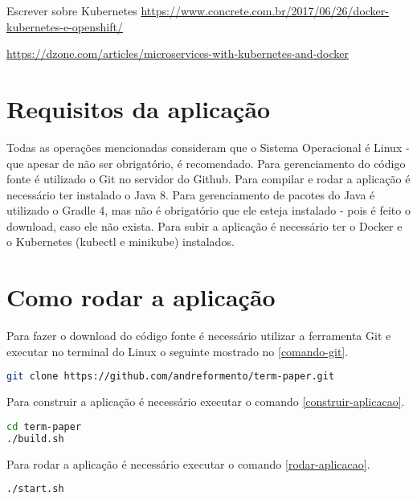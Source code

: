 Escrever sobre Kubernetes
\url{https://www.concrete.com.br/2017/06/26/docker-kubernetes-e-openshift/}

\url{https://dzone.com/articles/microservices-with-kubernetes-and-docker}



\section{Requisitos da aplicação}\label{requisitos-da-aplicacao}

Todas as operações mencionadas consideram que o Sistema Operacional é Linux
- que apesar de não ser obrigatório, é recomendado.
Para gerenciamento do código fonte é utilizado o Git no servidor do Github.
Para compilar e rodar a aplicação é necessário ter instalado o Java 8.
Para gerenciamento de pacotes do Java é utilizado o Gradle 4, mas não
é obrigatório que ele esteja instalado - pois é feito o download, caso
ele não exista. Para subir a aplicação é necessário ter o Docker e o
Kubernetes (kubectl e minikube) instalados.


\section{Como rodar a aplicação}\label{como-rodar-a-aplicacao}

Para fazer o download do código fonte é necessário utilizar a ferramenta Git
e executar no terminal do Linux o seguinte mostrado no \autoref{comando-git}.


\begin{lstlisting}[language=bash,label=comando-git,caption=Como fazer o download do código fonte com o Git]
git clone https://github.com/andreformento/term-paper.git
\end{lstlisting}

Para construir a aplicação é necessário executar o comando
\autoref{construir-aplicacao}.

\begin{lstlisting}[language=bash,label=construir-aplicacao,caption=Como construir a aplicação]
cd term-paper
./build.sh
\end{lstlisting}

Para rodar a aplicação é necessário executar o comando
\autoref{rodar-aplicacao}.

\begin{lstlisting}[language=bash,label=rodar-aplicacao,caption=Como rodar a aplicação]
./start.sh
\end{lstlisting}

